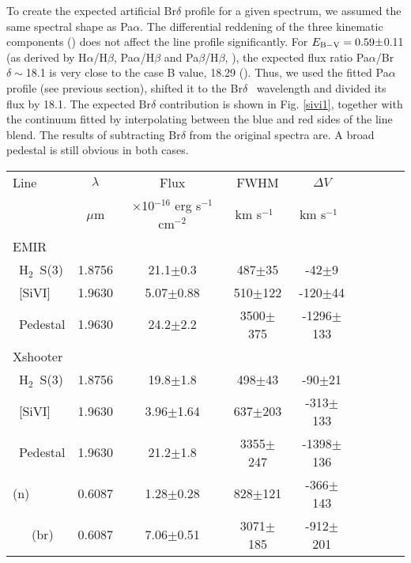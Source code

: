 \documentclass{aa}
\newcommand{\kms}{km s$^{-1}$~}
\newcommand{\pa}{Pa$\alpha~$}
\newcommand{\brd}{Br$\delta$}
\newcommand{\hmol}{H$_2$~}
\newcommand{\ergcms}{erg s$^{-1}$ cm$^{-2}$}
\begin{document}
To create the expected artificial Br$\delta$ profile for a given spectrum, we assumed the same spectral shape as    Pa$\alpha$. The differential reddening of the three kinematic components (\citealt{Holt2003,Holt2011}) does not affect the line profile significantly. 
For $E_{\rm B-V}=0.59\pm$0.11 (as derived by H$\alpha$/H$\beta$,  Pa$\alpha$/H$\beta$ and  Pa$\beta$/H$\beta$, \citealt{Rose2018}), the expected flux ratio Pa$\alpha$/Br$\delta\sim$18.1 is very close to the case B value, 18.29 (\citealt{Osterbrock2006}).  Thus, we used the fitted \pa profile (see previous section), shifted it  to the \brd~ wavelength and divided its flux by 18.1.  The expected Br$\delta$  contribution  is shown in Fig. \ref{sivi1}, together with the continuum  fitted by interpolating between the blue and red sides  of the line blend.
The results of subtracting Br$\delta$ from the original spectra are. A  broad pedestal is still obvious in both cases.

\begin{table*}
\centering
\begin{tabular}{lcccccccc}
\hline
Line	& 	  $\lambda$  	& Flux	&	FWHM   & $\Delta V$   \\  
	&	$\mu$m &	$\times$10$^{-16}$  \ergcms & \kms	& \kms \\ \hline	
 EMIR & &  \\ \hline
~\hmol S(3) &  1.8756&   21.1$\pm$0.3   &  487$\pm$35    & -42$\pm$9      \\ 
~[SiVI] &    1.9630 &  5.07$\pm$0.88 &  510$\pm$122   &  -120$\pm$44  \\
~Pedestal		 & 1.9630  & 	24.2$\pm$2.2     & 3500$\pm$375  & -1296$\pm$133 \\ \hline
 Xshooter &  & \\ \hline
~\hmol S(3) &  1.8756 &   19.8$\pm$1.8   &  498$\pm$43 &  -90$\pm$21  \\ 
~[SiVI] &  1.9630  & 3.96$\pm$1.64 &  637$\pm$203    & -313$\pm$133  \\
~Pedestal		& 1.9630   &	21.2$\pm$1.8     & 3355$\pm$247  & -1398$\pm$136  \\  \hline
[FeVII] (n) & 0.6087   &  1.28$\pm$0.28 &		 828$\pm$121  & -366$\pm$143\\
~~~(br)   &    0.6087      &   7.06$\pm$0.51 &    3071$\pm$185   &  -912$\pm$201 \\ 
\hline
\end{tabular}	
\caption{Fit of the \hmol (1-0) S(3)+[SiVI] blend using the EMIR spectrum, after removal of the Br$\delta$ contribution (Fig. \ref{fith2sivi}, right) and assuming  the pedestal is dominated by [SiVI] emission. The results of the [FeVII]  spectral fit are also shown for comparison. $\Delta V$ is computed for this line relative to the narrow component of H$\alpha$ as measured in the optical Xshooter spectrum where [FeVII] is detected. }
\label{fith2sivi}
\end{table*}
\end{document}

